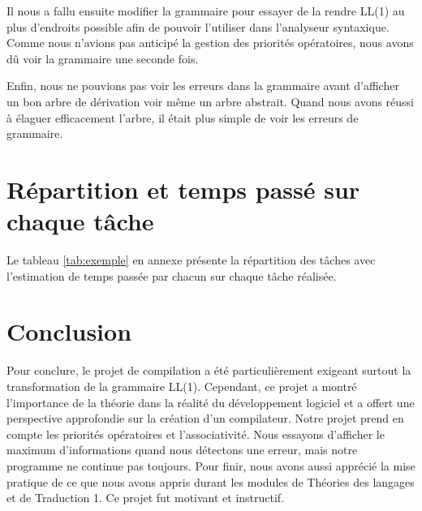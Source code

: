 \documentclass[11pt]{article}
\begin{document}
Il nous a fallu ensuite modifier la grammaire pour essayer de la rendre LL(1) au plus d'endroits possible afin de pouvoir l'utiliser dans l'analyseur syntaxique. Comme nous n'avions pas anticipé la gestion des priorités opératoires, nous avons dû voir la grammaire une seconde fois.

Enfin, nous ne pouvions pas voir les erreurs dans la grammaire avant d'afficher un bon arbre de dérivation voir même un arbre abstrait. Quand nous avons réussi à élaguer efficacement l'arbre, il était plus simple de voir les erreurs de grammaire. 

\section{Répartition et temps passé sur chaque tâche}

Le tableau \ref{tab:exemple} en annexe présente la répartition des tâches avec l'estimation de temps passée par chacun sur chaque tâche réalisée.

\section{Conclusion}

Pour conclure, le projet de compilation a été particulièrement exigeant surtout la transformation de la grammaire LL(1). Cependant, ce projet a montré l'importance de la théorie dans la réalité du développement logiciel et a offert une perspective approfondie sur la création d'un compilateur. 
Notre projet prend en compte les priorités opératoires et l'associativité. Nous essayons d'afficher le maximum d'informations quand nous détectons une erreur, mais notre programme ne continue pas toujours. 
Pour finir, nous avons aussi apprécié la mise pratique de ce que nous avons appris durant les modules de Théories des langages et de Traduction 1. Ce projet fut motivant et instructif. 

\newpage
\end{document}

